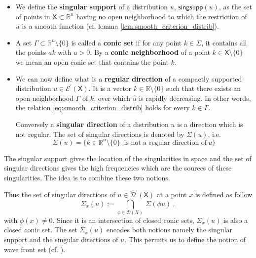 \documentclass[11pt]{book}
\newcommand{\singsupp}{\mathsf{singsupp}}
\newcommand{\Dcal}{\mathcal{D}}
\newcommand{\Ecal}{\mathcal{E}}
\newcommand{\Rbb}{\mathbb{R}}
\newcommand{\Xsf}{\mathsf{X}}
\theoremstyle{break}
\begin{document}
\begin{itemize}
\setlength\itemsep{0pt}
%
%
%
%
\item We define the \textbf{singular support} of a distribution $u$, $\singsupp(u)$, as the set of points in $\Xsf \subset \Rbb^n$ having no open neighborhood to which the restriction of $u$ is a smooth function (cf. lemma \ref{lem:smooth_criterion_distrib}). 
%
%
%
%
\item A set $\Gamma \subset \Rbb^n \setminus \{0\}$ is called a \textbf{conic set} if for any point $k \in \Sigma$, it contains all the points $a k$ with $a > 0$. By a \textbf{conic neighborhood} of a point $k \in \Xsf \setminus \{0\}$ we mean an open conic set that contains the point $k$. 
%
%
%
%
\item We can now define what is a \textbf{regular direction} of a compactly supported distribution $u\in\Ecal^\prime(\Xsf)$. It is a vector $k \in \Rbb\setminus\{0\}$ such that there exists an open neighborhood $\Gamma$ of $k$, over which $\hat{u}$ is rapidly decreasing. In other words, the relation \eqref{eq:smooth_criterion_distrib} holds for every $k \in \Gamma$.\par%
%
Conversely a \textbf{singular direction} of a distribution $u$ is a direction which is not regular. The set of singular directions is denoted by $\Sigma (u)$, i.e.
%
\begin{equation}
\Sigma(u) = \bigg\{ k \in \Rbb^n \setminus \{0\} \ \mbox{ is not a regular direction of} \ u  \bigg\} 
\label{eq:sing_direction}
\end{equation}
%
%
%
%
\end{itemize}


The singular support gives the location of the singularities in space and the set of singular directions gives the high frequencies which are the sources of these singularities. The idea is to combine these two notions. 


Thus the set of singular directions of $u\in\Dcal^\prime(\Xsf)$ at a point $x$ is defined as follow
%
\begin{equation*}
\Sigma_x(u) := \underset{\phi \in \Dcal(X)}{\bigcap} \ \Sigma(\phi u) \ , 
\end{equation*}
%
with $\phi(x) \neq 0$. Since it is an intersection of closed conic sets, $\Sigma_x(u)$ is also a closed conic set. The set $\Sigma_x(u)$ encodes both notions namely the singular support and the singular directions of $u$. This permits us to define the notion of wave front set (cf. \cite{hormander_analysis_1990}).
\end{document}
